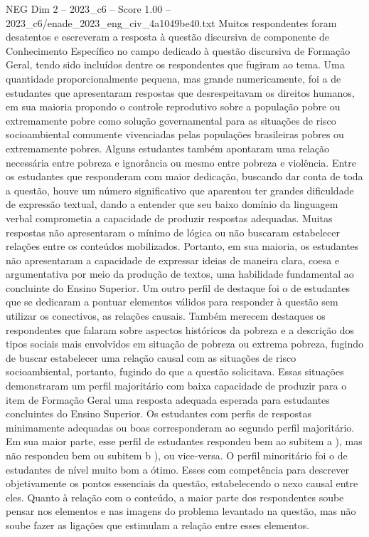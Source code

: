 \begin{textsample}{NEG Dim 2 – 2023\_c6 – Score 1.00 – 2023\_c6/enade\_2023\_eng\_civ\_4a1049be40.txt}
Muitos respondentes foram desatentos e escreveram a resposta à questão discursiva de componente de Conhecimento Específico no campo dedicado à questão discursiva de Formação Geral, tendo sido incluídos dentre os respondentes que fugiram ao tema.
Uma quantidade proporcionalmente pequena, mas grande numericamente, foi a de estudantes que apresentaram respostas que desrespeitavam os direitos humanos, em sua maioria propondo o controle reprodutivo sobre a população pobre ou extremamente pobre como solução governamental para as situações de risco socioambiental comumente vivenciadas pelas populações brasileiras pobres ou extremamente pobres.
Alguns estudantes também apontaram uma relação necessária entre pobreza e ignorância ou mesmo entre pobreza e violência.
Entre os estudantes que responderam com maior dedicação, buscando dar conta de toda a questão, houve um número significativo que aparentou ter grandes dificuldade de expressão textual, dando a entender que seu baixo domínio da linguagem verbal comprometia a capacidade de produzir respostas adequadas.
Muitas respostas não apresentaram o mínimo de lógica ou não buscaram estabelecer relações entre os conteúdos mobilizados.
Portanto, em sua maioria, os estudantes não apresentaram a capacidade de expressar ideias de maneira clara, coesa e argumentativa por meio da produção de textos, uma habilidade fundamental ao concluinte do Ensino Superior.
Um outro perfil de destaque foi o de estudantes que se dedicaram a pontuar elementos válidos para responder à questão sem utilizar os conectivos, as relações causais.
Também merecem destaques os respondentes que falaram sobre aspectos históricos da pobreza e a descrição dos tipos sociais mais envolvidos em situação de pobreza ou extrema pobreza, fugindo de buscar estabelecer uma relação causal com as situações de risco socioambiental, portanto, fugindo do que a questão solicitava.
Essas situações demonstraram um perfil majoritário com baixa capacidade de produzir para o item de Formação Geral uma resposta adequada esperada para estudantes concluintes do Ensino Superior.
Os estudantes com perfis de respostas minimamente adequadas ou boas corresponderam ao segundo perfil majoritário.
Em sua maior parte, esse perfil de estudantes respondeu bem ao subitem a ), mas não respondeu bem ou subitem b ), ou vice-versa.
O perfil minoritário foi o de estudantes de nível muito bom a ótimo.
Esses com competência para descrever objetivamente os pontos essenciais da questão, estabelecendo o nexo causal entre eles.
Quanto à relação com o conteúdo, a maior parte dos respondentes soube pensar nos elementos e nas imagens do problema levantado na questão, mas não soube fazer as ligações que estimulam a relação entre esses elementos.

\end{textsample}
